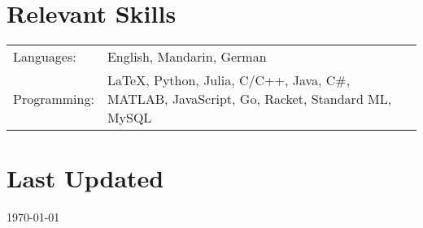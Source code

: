 \documentclass[margin,line]{res}
\newenvironment{list2}{
  \begin{list}{$\bullet$}{%
      \setlength{\itemsep}{0in}
      \setlength{\parsep}{0in} \setlength{\parskip}{0in}
      \setlength{\topsep}{0in} \setlength{\partopsep}{0in}
      \setlength{\leftmargin}{0.2in}}}{\end{list}}
\begin{document}
\begin{resume}



\section{\sc Relevant Skills}

\vspace{.05in}
\begin{tabular}{@{}p{0.8in}p{4.25in}}

Languages:& English, Mandarin, German \\
Programming:& \LaTeX, Python, Julia, C/C++, Java, C\#, MATLAB, JavaScript, Go, Racket, Standard ML, MySQL

\end{tabular}


\section{\sc Last Updated}
\today


\end{resume}
\end{document}
